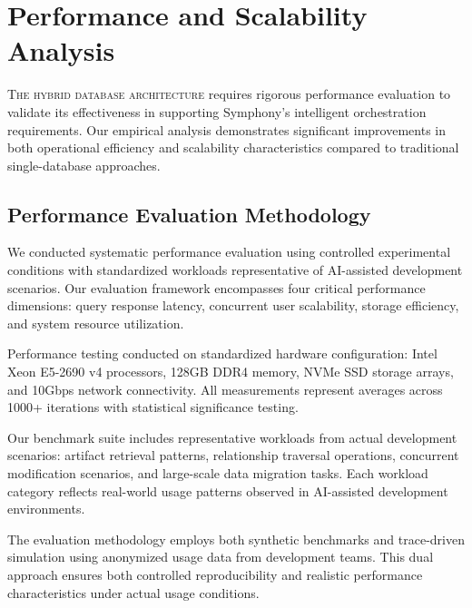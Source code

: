 
\section*{Performance and Scalability Analysis}

\lettrine{T}{he hybrid database architecture} requires rigorous performance evaluation to validate its effectiveness in supporting Symphony's intelligent orchestration requirements. Our empirical analysis demonstrates significant improvements in both operational efficiency and scalability characteristics compared to traditional single-database approaches.

\subsection*{Performance Evaluation Methodology}

We conducted systematic performance evaluation using controlled experimental conditions with standardized workloads representative of AI-assisted development scenarios. Our evaluation framework encompasses four critical performance dimensions: query response latency, concurrent user scalability, storage efficiency, and system resource utilization.

\begin{infobox}[title=Evaluation Environment]
Performance testing conducted on standardized hardware configuration: Intel Xeon E5-2690 v4 processors, 128GB DDR4 memory, NVMe SSD storage arrays, and 10Gbps network connectivity. All measurements represent averages across 1000+ iterations with statistical significance testing.
\end{infobox}

Our benchmark suite includes representative workloads from actual development scenarios: artifact retrieval patterns, relationship traversal operations, concurrent modification scenarios, and large-scale data migration tasks. Each workload category reflects real-world usage patterns observed in AI-assisted development environments.

The evaluation methodology employs both synthetic benchmarks and trace-driven simulation using anonymized usage data from development teams. This dual approach ensures both controlled reproducibility and realistic performance characteristics under actual usage conditions.

